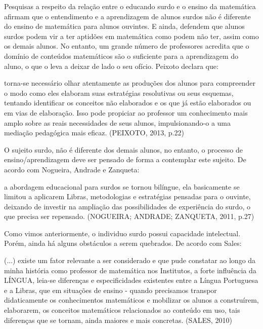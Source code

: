 \documentclass[brasil]{abnt}
\begin{document}
	Pesquisas a respeito da relação entre o educando surdo e o ensino da matemática afirmam que o entendimento e a aprendizagem de alunos surdos não é diferente do ensino de matemática para alunos ouvintes. 
	E ainda, defendem que alunos surdos podem vir a ter aptidões em matemática como podem não ter, assim como os demais alunos. No entanto, um grande número de professores acredita que o domínio de conteúdos 
	matemáticos são o suficiente para a aprendizagem do aluno, o que o leva a deixar de lado o seu ofício. Peixoto declara que:
	
		\begin{citacao}[...] torna-se necessário olhar atentamente as produções dos alunos para compreender o modo como eles elaboram suas estratégias resolutivas ou seus esquemas, tentando identificar 
						os conceitos não elaborados e os que já estão elaborados ou em vias de elaboração. Isso pode propiciar ao professor um conhecimento mais amplo sobre as reais necessidades de seus 
						alunos, impulsionando-o a uma mediação pedagógica mais eficaz. (PEIXOTO, 2013, p.22)
		\end{citacao}
	
	O sujeito surdo, não é diferente dos demais alunos, no entanto, o processo de ensino/aprendizagem deve ser pensado de forma a contemplar este sujeito. De acordo com Nogueira, Andrade e Zanqueta:

		\begin{citacao}[...] a abordagem educacional para surdos se tornou bilíngue, ela basicamente se limitou a aplicarem Libras, metodologias e estratégias pensadas para o ouvinte, deixando de investir 
						na ampliação das possibilidades de experiência do surdo, o que precisa ser repensado. (NOGUEIRA; ANDRADE; ZANQUETA, 2011, p.27)
		\end{citacao}
	
	Como vimos anteriormente, o individuo surdo possui capacidade intelectual. Porém, ainda há alguns obstáculos a serem quebrados. De acordo com Sales:
			
			\begin{citacao} (...) existe um fator relevante a ser considerado e que pude constatar ao longo da minha história como professor de matemática nos Institutos, a forte influência da LÍNGUA, 
							leia-se diferenças e especificidades existentes entre a Língua Portuguesa e a Libras, que em situações de ensino - quando precisamos transpor didaticamente os conhecimentos 
							matemáticos e mobilizar os alunos a construírem, elaborarem, os conceitos matemáticos relacionados ao conteúdo em uso, tais diferenças que se tornam, ainda maiores e mais 
							concretas. (SALES, 2010) 
			\end{citacao}
	
\end{document}
